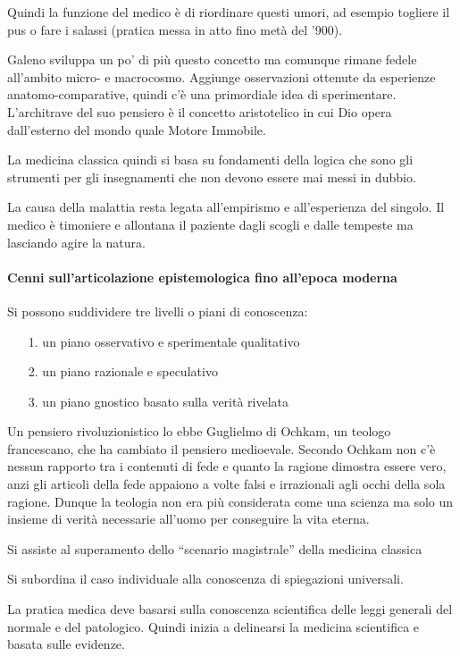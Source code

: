   Quindi la funzione del medico è di riordinare questi umori, ad esempio
  togliere il pus o fare i salassi (pratica messa in atto fino metà del
  '900).

  Galeno sviluppa un po' di più questo concetto ma comunque rimane
  fedele all'ambito micro- e macrocosmo. Aggiunge osservazioni ottenute
  da esperienze anatomo-comparative, quindi c'è una primordiale idea di
  sperimentare. L'architrave del suo pensiero è il concetto aristotelico
  in cui Dio opera dall'esterno del mondo quale Motore Immobile.

  La medicina classica quindi si basa su fondamenti della logica che
  sono gli strumenti per gli insegnamenti che non devono essere mai
  messi in dubbio.

  La causa della malattia resta legata all'empirismo e all'esperienza
  del singolo. Il medico è timoniere e allontana il paziente dagli
  scogli e dalle tempeste ma lasciando agire la natura.

  \paragraph{Cenni sull'articolazione epistemologica fino all'epoca moderna}

  Si possono suddividere tre livelli o piani di conoscenza:
  
\begin{itemize}
\item[1.]
  un piano osservativo e sperimentale qualitativo
\item[2.]
  un piano razionale e speculativo
\item[3.]
  un piano gnostico basato sulla verità rivelata
\end{itemize}

  Un pensiero rivoluzionistico lo ebbe Guglielmo di Ochkam, un teologo
  francescano, che ha cambiato il pensiero medioevale. Secondo Ochkam
  non c'è nessun rapporto tra i contenuti di fede e quanto la ragione
  dimostra essere vero, anzi gli articoli della fede appaiono a volte
  falsi e irrazionali agli occhi della sola ragione. Dunque la teologia
  non era più considerata come una scienza ma solo un insieme di verità
  necessarie all'uomo per conseguire la vita eterna.

  Si assiste al superamento dello ``scenario magistrale'' della medicina
  classica

  Si subordina il caso individuale alla conoscenza di spiegazioni
  universali.

  La pratica medica deve basarsi sulla conoscenza scientifica delle
  leggi generali del normale e del patologico. Quindi inizia a
  delinearsi la medicina scientifica e basata sulle evidenze.


